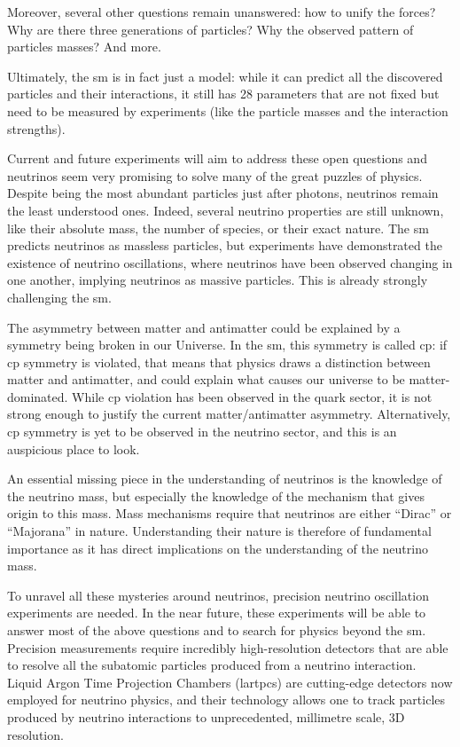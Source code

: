 Moreover, several other questions remain unanswered: how to unify the forces? Why are there three generations of particles? Why the observed pattern of particles masses? And more.

Ultimately, the \acrshort{sm} is in fact just a model: while it can predict all the discovered particles and their interactions, it still has 28 parameters that are not fixed but need to be measured by experiments (like the particle masses and the interaction strengths).

Current and future experiments will aim to address these open questions and neutrinos seem very promising to solve many of the great puzzles of physics. Despite being the most abundant particles just after photons, neutrinos remain the least understood ones. Indeed, several neutrino properties are still unknown, like their absolute mass, the number of species, or their exact nature. The \acrshort{sm} predicts neutrinos as massless particles, but experiments \cite{superk, sno} have demonstrated the existence of neutrino oscillations, where neutrinos have been observed changing in one another, implying neutrinos as massive particles. This is already strongly challenging the \acrshort{sm}.

The asymmetry between matter and antimatter could be explained by a symmetry being broken in our Universe. In the \acrshort{sm}, this symmetry is called \acrshort{cp}: if \acrshort{cp} symmetry is violated, that means that physics draws a distinction between matter and antimatter, and could explain what causes our universe to be matter-dominated. While \acrshort{cp} violation has been observed in the quark sector, it is not strong enough to justify the current matter/antimatter asymmetry. Alternatively, \acrshort{cp} symmetry is yet to be observed in the neutrino sector, and this is an auspicious place to look.

An essential missing piece in the understanding of neutrinos is the knowledge of the neutrino mass, but especially the knowledge of the mechanism that gives origin to this mass. 
Mass mechanisms require that neutrinos are either ``Dirac'' or ``Majorana'' in nature. Understanding their nature is therefore of fundamental importance as it has direct implications on the understanding of the neutrino mass.

To unravel all these mysteries around neutrinos, precision neutrino oscillation experiments are needed. In the near future, these experiments will be able to answer most of the above questions and to search for physics beyond the \acrshort{sm}.  
Precision measurements require incredibly high-resolution detectors that are able to resolve all the subatomic particles produced from a neutrino interaction. Liquid Argon Time Projection Chambers (\acrshort{lartpc}s) are cutting-edge detectors now employed for neutrino physics, and their technology allows one to track particles produced by neutrino interactions to unprecedented, millimetre scale, 3D resolution.

